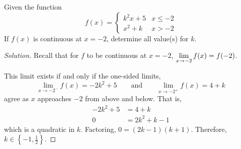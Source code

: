 \documentclass{agony}
\begin{document}
\question Given the function \begin{equation*}
  f(x) = \begin{cases}
    k^2x+5 & x \leq -2 \\
    x^2+k  & x > -2
  \end{cases}
\end{equation*}
If $f(x)$ is continuous at $x=-2$, determine all value(s) for $k$. %
\begin{proof}[Solution]
  Recall that for $f$ to be continuous at $x=-2$, $\lim\limits_{x\to-2}f(x)=f(-2)$.

  This limit exists if and only if the one-sided limits,
  \[ \lim_{x\to-2^-}f(x) = -2k^2+5 \qquad \text{and} \qquad \lim_{x\to-2^+}f(x) = 4+k \]
  agree as $x$ approaches $-2$ from above and below. That is,
  \begin{align*}
    -2k^2 + 5 & = 4 + k        \\
    0         & = 2k^2 + k - 1
  \end{align*}
  which is a quadratic in $k$.
  Factoring, $0 = (2k-1)(k+1)$.
  Therefore, $k \in \left\{-1,\frac12\right\}$.
\end{proof}
\end{document}
